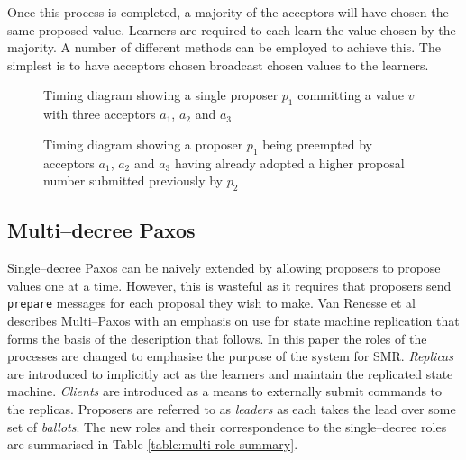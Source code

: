 Once this process is completed, a majority of the acceptors will have chosen the same proposed value. Learners are required to each learn the value chosen by the majority. A number of different methods can be employed to achieve this. The simplest is to have acceptors chosen broadcast chosen values to the learners. \\

\begin{figure}
  \centering
  
  \caption{Timing diagram showing a single proposer $p_1$ committing a value $v$ with three acceptors $a_1$, $a_2$ and $a_3$}
  \label{fig:single-paxos-1}  
\end{figure}

\begin{figure}
  \centering
  
  \caption{Timing diagram showing a proposer $p_1$ being preempted by acceptors $a_1$, $a_2$ and $a_3$ having already adopted a higher proposal number submitted previously by $p_2$}
  \label{fig:single-paxos-2}  
\end{figure}



\subsection{Multi--decree Paxos}
\label{subsection:multi-decree-paxos}

Single--decree Paxos can be naively extended by allowing proposers to propose values one at a time. However, this is wasteful as it requires that proposers send \texttt{prepare} messages for each proposal they wish to make. Van Renesse et al \cite{VanRenesse:2015:PMM:2737799.2673577} describes Multi--Paxos with an emphasis on use for state machine replication that forms the basis of the description that follows. In this paper the roles of the processes are changed to emphasise the purpose of the system for SMR. \emph{Replicas} are introduced to implicitly act as the learners and maintain the replicated state machine. \emph{Clients} are introduced as a means to externally submit commands to the replicas. Proposers are referred to as \emph{leaders} as each takes the lead over some set of \emph{ballots}. The new roles and their correspondence to the single--decree roles are summarised in Table \ref{table:multi-role-summary}.

